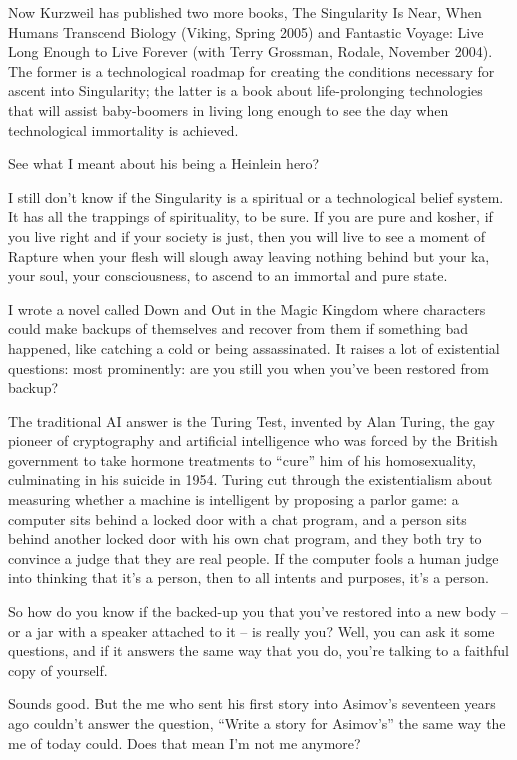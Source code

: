 Now Kurzweil has published two more books, The Singularity Is Near,
When Humans Transcend Biology (Viking, Spring 2005) and Fantastic
Voyage: Live Long Enough to Live Forever (with Terry Grossman,
Rodale, November 2004). The former is a technological roadmap for
creating the conditions necessary for ascent into Singularity; the
latter is a book about life-prolonging technologies that will
assist baby-boomers in living long enough to see the day when
technological immortality is achieved.

See what I meant about his being a Heinlein hero?

I still don't know if the Singularity is a spiritual or a
technological belief system. It has all the trappings of
spirituality, to be sure. If you are pure and kosher, if you live
right and if your society is just, then you will live to see a
moment of Rapture when your flesh will slough away leaving nothing
behind but your ka, your soul, your consciousness, to ascend to an
immortal and pure state.

I wrote a novel called Down and Out in the Magic Kingdom where
characters could make backups of themselves and recover from them
if something bad happened, like catching a cold or being
assassinated. It raises a lot of existential questions: most
prominently: are you still you when you've been restored from
backup?

The traditional AI answer is the Turing Test, invented by Alan
Turing, the gay pioneer of cryptography and artificial intelligence
who was forced by the British government to take hormone treatments
to ``cure'' him of his homosexuality, culminating in his suicide in
1954. Turing cut through the existentialism about measuring whether
a machine is intelligent by proposing a parlor game: a computer
sits behind a locked door with a chat program, and a person sits
behind another locked door with his own chat program, and they both
try to convince a judge that they are real people. If the computer
fools a human judge into thinking that it's a person, then to all
intents and purposes, it's a person.

So how do you know if the backed-up you that you've restored into a
new body -- or a jar with a speaker attached to it -- is really
you? Well, you can ask it some questions, and if it answers the
same way that you do, you're talking to a faithful copy of
yourself.

Sounds good. But the me who sent his first story into Asimov's
seventeen years ago couldn't answer the question, ``Write a story
for Asimov's'' the same way the me of today could. Does that mean
I'm not me anymore?

